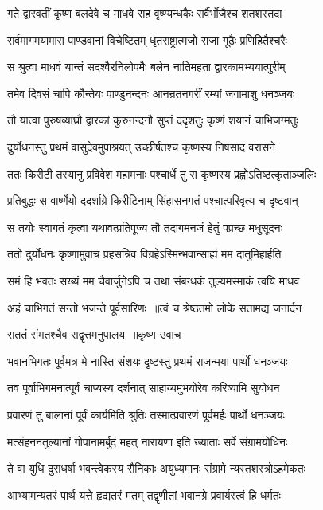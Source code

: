 \twolineshloka
{गते द्वारवतीं कृष्ण बलदेवे च माधवे}
{सह वृष्ण्यन्धकैः सर्वैर्भोजैश्च शतशस्तदा}


\twolineshloka
{सर्वमागमयामास पाण्डवानां विचेष्टितम्}
{धृतराष्ट्रात्मजो राजा गूढैः प्रणिहितैश्चरैः}


\twolineshloka
{स श्रुत्वा माधवं यान्तं सदश्वैरनिलोपमैः}
{बलेन नातिमहता द्वारकामभ्ययात्पुरीम्}


\twolineshloka
{तमेव दिवसं चापि कौन्तेयः पाण्डुनन्दनः}
{आनन्रतनगरीं रम्यां जगामाशु धनञ्जयः}


\twolineshloka
{तौ यात्वा पुरुषव्याघ्रौ द्वारकां कुरुनन्दनौ}
{सुप्तं ददृशतुः कृष्णं शयानं चाभिजग्मतुः}


\twolineshloka
{दुर्योधनस्तु प्रथमं वासुदेवमुपाश्रयत्}
{उच्छीर्षतश्च कृष्णस्य निषसाद वरासने}


\twolineshloka
{ततः किरीटी तस्यानु प्रविवेश महामनाः}
{पश्चार्धे तु स कृष्णस्य प्रह्वोऽतिष्ठत्कृताञ्जलिः}


\twolineshloka
{प्रतिबुद्धः स वार्ष्णेयो ददर्शाग्रे किरीटिनाम्}
{सिंहासनगतं पश्चात्परिवृत्य च दृष्टवान्}


\twolineshloka
{स तयोः स्वागतं कृत्वा यथावत्प्रतिपूज्य तौ}
{तदागमनजं हेतुं पप्रच्छ मधुसूदनः}


\twolineshloka
{ततो दुर्योधनः कृष्णामुवाच प्रहसन्निव}
{विग्रहेऽस्मिन्भवान्साह्यं मम दातुमिहार्हति}


\twolineshloka
{समं हि भवतः सख्यं मम चैवार्जुनेऽपि च}
{तथा संबन्धकं तुल्यमस्माकं त्वयि माधव}


\twolineshloka
{अहं चाभिगतं सन्तो भजन्ते पूर्वसारिणः ॥त्वं च श्रेष्ठतमो लोके सतामद्य जनार्दन}
{}


\twolineshloka
{सततं संमतश्चैव सद्वृत्तमनुपालय ॥कृष्ण उवाच}
{}


\twolineshloka
{भवानभिगतः पूर्वमत्र मे नास्ति संशयः}
{दृष्टस्तु प्रथमं राजन्मया पार्थो धनञ्जयः}


\twolineshloka
{तव पूर्वाभिगमनात्पूर्वं चाप्यस्य दर्शनात्}
{साहाय्यमुभयोरेव करिष्यामि सुयोधन}


\twolineshloka
{प्रवारणं तु बालानां पूर्वं कार्यमिति श्रुतिः}
{तस्मात्प्रवारणं पूर्वमर्हः पार्थो धनञ्जयः}


\twolineshloka
{मत्संहननतुल्यानां गोपानामर्बुदं महत्}
{नारायणा इति ख्याताः सर्वे संग्रामयोधिनः}


\twolineshloka
{ते वा युधि दुराधर्षा भवन्त्वेकस्य सैनिकाः}
{अयुध्यमानः संग्रामे न्यस्तशस्त्रोऽहमेकतः}


\twolineshloka
{आभ्यामन्यतरं पार्थ यत्ते हृद्यतरं मतम्}
{तद्वृणीतां भवानग्रे प्रवार्यस्त्वं हि धर्मतः}


